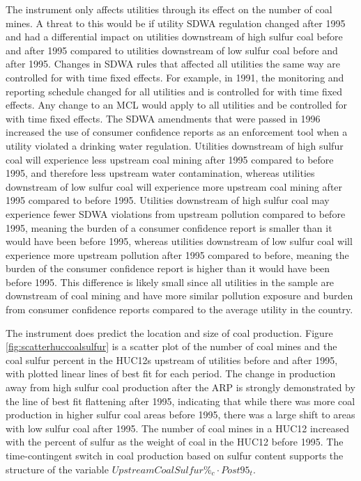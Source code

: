 \documentclass{article}
\begin{document}
The instrument only affects utilities through its effect on the number of coal mines. A threat to this would be if utility SDWA regulation changed after 1995 and had a differential impact on utilities downstream of high sulfur coal before and after 1995 compared to utilities downstream of low sulfur coal before and after 1995. Changes in SDWA rules that affected all utilities the same way are controlled for with time fixed effects. For example, in 1991, the monitoring and reporting schedule changed for all utilities and is controlled for with time fixed effects. Any change to an MCL would apply to all utilities and be controlled for with time fixed effects. The SDWA amendments that were passed in 1996 increased the use of consumer confidence reports as an enforcement tool when a utility violated a drinking water regulation. Utilities downstream of high sulfur coal will experience less upstream coal mining after 1995 compared to before 1995, and therefore less upstream water contamination, whereas utilities downstream of low sulfur coal will experience more upstream coal mining after 1995 compared to before 1995. Utilities downstream of high sulfur coal may experience fewer SDWA violations from upstream pollution compared to before 1995, meaning the burden of a consumer confidence report is smaller than it would have been before 1995, whereas utilities downstream of low sulfur coal will experience more upstream pollution after 1995 compared to before, meaning the burden of the consumer confidence report is higher than it would have been before 1995. This difference is likely small since all utilities in the sample are downstream of coal mining and have more similar pollution exposure and burden from consumer confidence reports compared to the average utility in the country.


The instrument does predict the location and size of coal production. Figure \ref{fig:scatterhuccoalsulfur} is a scatter plot of the number of coal mines and the coal sulfur percent in the HUC12s upstream of utilities before and after 1995, with plotted linear lines of best fit for each period. The change in production away from high sulfur coal production after the ARP is strongly demonstrated by the line of best fit flattening after 1995, indicating that while there was more coal production in higher sulfur coal areas before 1995, there was a large shift to areas with low sulfur coal after 1995. The number of coal mines in a HUC12 increased with the percent of sulfur as the weight of coal in the HUC12 before 1995. The time-contingent switch in coal production based on sulfur content supports the structure of the variable $UpstreamCoalSulfur\%_c \cdot Post95_t$.
\end{document}
